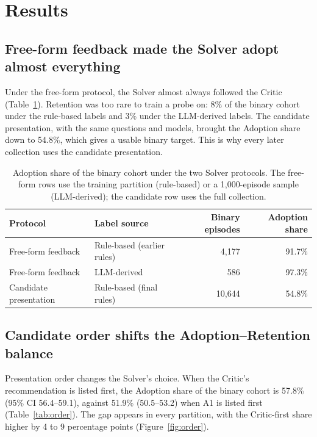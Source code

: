 \section{Results}
\label{sec:results}


\subsection{Free-form feedback made the Solver adopt almost everything}
\label{sec:res-protocol}

Under the free-form protocol, the Solver almost always followed the Critic
(Table~\ref{tab:protocol}). Retention was too rare to train a probe on: 8\%
of the binary cohort under the rule-based labels and 3\% under the
LLM-derived labels. The candidate presentation, with the same questions and
models, brought the Adoption share down to 54.8\%, which gives a usable
binary target. This is why every later collection uses the candidate
presentation.

\begin{table}[htbp]
    \centering
    \caption{Adoption share of the binary cohort under the two Solver
    protocols. The free-form rows use the training partition (rule-based) or
    a 1,000-episode sample (LLM-derived); the candidate row uses the full
    collection.}
    \label{tab:protocol}
    \begin{tabular}{llrr}
        \toprule
        Protocol & Label source & Binary episodes & Adoption share \\
        \midrule
        Free-form feedback & Rule-based (earlier rules) & 4,177 & 91.7\% \\
        Free-form feedback & LLM-derived                &   586 & 97.3\% \\
        Candidate presentation & Rule-based (final rules) & 10,644 & 54.8\% \\
        \bottomrule
    \end{tabular}
\end{table}

\subsection{Candidate order shifts the Adoption--Retention balance}
\label{sec:res-order}

Presentation order changes the Solver's choice. When the Critic's
recommendation is listed first, the Adoption share of the binary cohort is
57.8\% (95\% CI 56.4--59.1), against 51.9\% (50.5--53.2) when A1 is listed
first (Table~\ref{tab:order}). The gap appears in every partition, with the
Critic-first share higher by 4 to 9 percentage points
(Figure~\ref{fig:order}).

